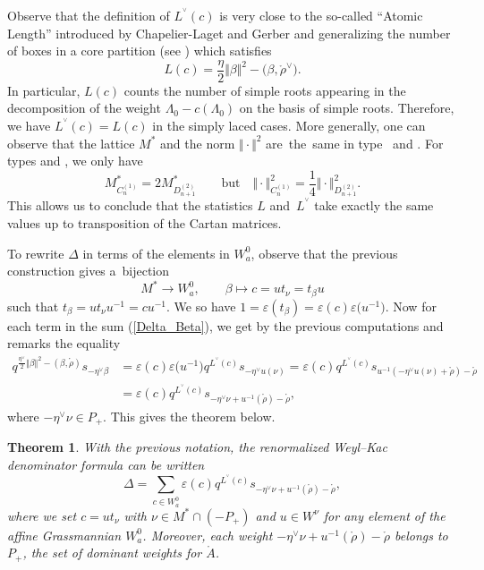 \documentclass[10pt,a4paper]{amsart}
\newtheorem{Theorem}{Theorem}[section]
\numberwithin{equation}{section}
\begin{document}
\begin{Remark}
	\label{rem:reseau} Observe that the definition of $L^{^{\vee}}(c)$ is very
	close to the so-called ``Atomic Length'' introduced by Chapelier-Laget and
	Gerber and generalizing the number of boxes in a core partition (see
	\cite[Corollary~8.2]{CGT}) which satisfies
	\[
	L(c)=\frac{\eta}{2} \Vert \beta \Vert ^{2}-\bigl(\beta,\mathring{\rho}^{\vee}\bigr).
	\]
	In particular, $L(c)$ counts the number of simple roots appearing in the
	decomposition of the weight $\Lambda_{0}-c(\Lambda_{0})$ on the basis of
	simple roots. Therefore, we have $L^{^{\vee}}(c)=L(c)$ in the simply laced
	cases. More generally, one can observe that the lattice $M^{\ast}$ and the
	norm $ \Vert \cdot \Vert ^{2}$ are~the~same in type~ and
	. For types  and ,
    we only have
\[
M_{C_{n}^{(1)}}^{\ast}=2M_{D_{n+1}^{(2)}}^{\ast} \qquad \text{but} \quad \Vert \cdot \Vert _{C_{n}^{(1)}}^{2}=\frac{1}{4} \Vert \cdot \Vert _{D_{n+1}^{(2)}}^{2}.
\]
 This
	allows us to conclude that the statistics $L$ and~$L^{^{\vee}}$ take exactly
	the same values up to transposition of the Cartan matrices.
\end{Remark}

To rewrite $\Delta$ in terms of the elements in $W_{a}^{0}$, observe that the
previous construction gives a~bijection
\begin{equation}
M^{\ast}\rightarrow W_{a}^{0},\qquad
\beta\longmapsto c=ut_{\nu}=t_{\beta}u
 \label{betac}
\end{equation}
such that $t_{\beta}=ut_{\nu}u^{-1}=cu^{-1}$. We so have $1=\varepsilon
(t_{\beta})=\varepsilon(c)\varepsilon\bigl(u^{-1}\bigr)$. Now for each term in the sum
(\ref{Delta_Beta}), we get by the previous computations and remarks the
equality%
\begin{align*}
q^{\frac{\eta^{\vee}}{2} \Vert \beta \Vert ^{2}-(\beta,\mathring
	{\rho})}s_{-\eta^{\vee}\beta}&=\varepsilon(c)\varepsilon\bigl(u^{-1}\bigr)q^{L^{^{\vee}%
	}(c)}s_{-\eta^{\vee}u(\nu)}=\varepsilon(c)q^{L^{^{\vee}}(c)}s_{u^{-1}(
	-\eta^{\vee}u(\nu)+\mathring{\rho}) -\mathring{\rho}}
\\	&=\varepsilon
(c)q^{L^{^{\vee}}(c)}s_{-\eta^{\vee}\nu+u^{-1}(\mathring{\rho})-\mathring
	{\rho}},%
\end{align*}
where $-\eta^{\vee}\nu\in P_{+}$. This gives the theorem below.


\begin{Theorem}
	\label{thm:macdo} With the previous notation, the renormalized Weyl--Kac
	denominator formula can be written
	\[
	\Delta=\sum_{c\in W_{a}^{0}}\varepsilon(c)q^{L^{^{\vee}}(c)}s_{-\eta^{\vee}%
		\nu+u^{-1}(\mathring{\rho})-\mathring{\rho}},%
	\]
	where we set $c=ut_{\nu}$ with $\nu\in M^{\ast}\cap(-P_{+})$ and $u\in W^{\nu
	}$ for any element of the affine Grassmannian $W_{a}^{0}$. Moreover, each
	weight $-\eta^{\vee}\nu+u^{-1}(\mathring{\rho})-\mathring{\rho}$ belongs to
	$P_{+}$, the set of dominant weights for $\mathring{A}$.
\end{Theorem}
\end{document}
